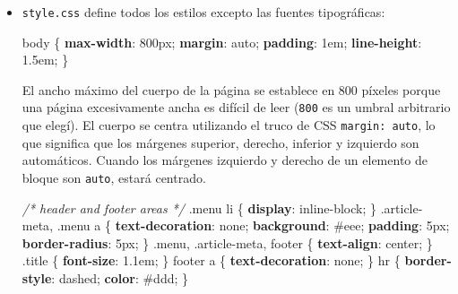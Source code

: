 \documentclass[12pt,]{krantz}
\makeatletter
\newenvironment{Shaded}{\begin{snugshade}}{\end{snugshade}}
\newcommand{\CommentTok}[1]{\textcolor[rgb]{0.56,0.35,0.01}{\textit{#1}}}
\newcommand{\DecValTok}[1]{\textcolor[rgb]{0.00,0.00,0.81}{#1}}
\newcommand{\FunctionTok}[1]{\textcolor[rgb]{0.00,0.00,0.00}{#1}}
\newcommand{\KeywordTok}[1]{\textcolor[rgb]{0.13,0.29,0.53}{\textbf{#1}}}
\newcommand{\NormalTok}[1]{#1}
\newenvironment{kframe}{%
\medskip{}
\setlength{\fboxsep}{.8em}
 \def\at@end@of@kframe{}%
 \ifinner\ifhmode%
  \def\at@end@of@kframe{\end{minipage}}%
  \begin{minipage}{\columnwidth}%
 \fi\fi%
 \def\FrameCommand##1{\hskip\@totalleftmargin \hskip-\fboxsep
 \colorbox{shadecolor}{##1}\hskip-\fboxsep
     \hskip-\linewidth \hskip-\@totalleftmargin \hskip\columnwidth}%
 \MakeFramed {\advance\hsize-\width
   \@totalleftmargin\z@ \linewidth\hsize
   \@setminipage}}%
 {\par\unskip\endMakeFramed%
 \at@end@of@kframe}
\renewenvironment{Shaded}{\begin{kframe}}{\end{kframe}}
\theoremstyle{definition}
\theoremstyle{definition}
\theoremstyle{definition}
\theoremstyle{remark}
\makeatother
\begin{document}
\begin{itemize}
\item
  \texttt{style.css} define todos los estilos excepto las fuentes
  tipográficas:

\begin{Shaded}
\begin{Highlighting}[]
\NormalTok{body \{}
  \KeywordTok{max-width}\NormalTok{: }\DecValTok{800px}\NormalTok{;}
  \KeywordTok{margin}\NormalTok{: }\DecValTok{auto}\NormalTok{;}
  \KeywordTok{padding}\NormalTok{: }\DecValTok{1em}\NormalTok{;}
  \KeywordTok{line-height}\NormalTok{: }\DecValTok{1.5em}\NormalTok{;}
\NormalTok{\}}
\end{Highlighting}
\end{Shaded}

  El ancho máximo del cuerpo de la página se establece en 800 píxeles
  porque una página excesivamente ancha es difícil de leer (\texttt{800}
  es un umbral arbitrario que elegí). El cuerpo se centra utilizando el
  truco de CSS \texttt{margin:\ auto}, lo que significa que los márgenes
  superior, derecho, inferior y izquierdo son automáticos. Cuando los
  márgenes izquierdo y derecho de un elemento de bloque son
  \texttt{auto}, estará centrado.

\begin{Shaded}
\begin{Highlighting}[]
\CommentTok{/* header and footer areas */}
\FunctionTok{.menu}\NormalTok{ li \{ }\KeywordTok{display}\NormalTok{: }\DecValTok{inline-block}\NormalTok{; \}}
\FunctionTok{.article-meta}\NormalTok{, }\FunctionTok{.menu}\NormalTok{ a \{}
  \KeywordTok{text-decoration}\NormalTok{: }\DecValTok{none}\NormalTok{;}
  \KeywordTok{background}\NormalTok{: }\DecValTok{#eee}\NormalTok{;}
  \KeywordTok{padding}\NormalTok{: }\DecValTok{5px}\NormalTok{;}
  \KeywordTok{border-radius}\NormalTok{: }\DecValTok{5px}\NormalTok{;}
\NormalTok{\}}
\FunctionTok{.menu}\NormalTok{, }\FunctionTok{.article-meta}\NormalTok{, footer \{ }\KeywordTok{text-align}\NormalTok{: }\DecValTok{center}\NormalTok{; \}}
\FunctionTok{.title}\NormalTok{ \{ }\KeywordTok{font-size}\NormalTok{: }\DecValTok{1.1em}\NormalTok{; \}}
\NormalTok{footer a \{ }\KeywordTok{text-decoration}\NormalTok{: }\DecValTok{none}\NormalTok{; \}}
\NormalTok{hr \{}
  \KeywordTok{border-style}\NormalTok{: }\DecValTok{dashed}\NormalTok{;}
  \KeywordTok{color}\NormalTok{: }\DecValTok{#ddd}\NormalTok{;}
\NormalTok{\}}
\end{Highlighting}
\end{Shaded}


\end{itemize}
\end{document}
